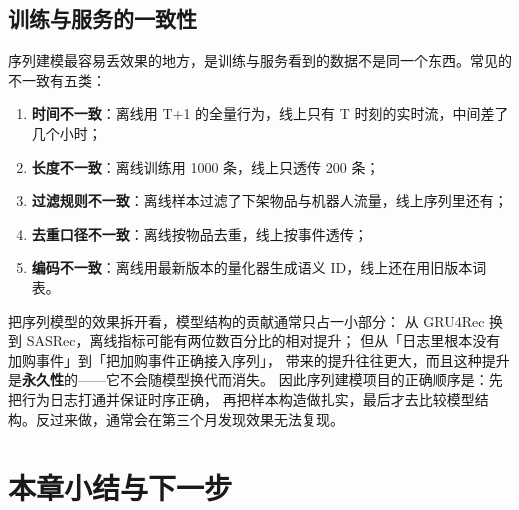 \subsection{训练与服务的一致性}

序列建模最容易丢效果的地方，是训练与服务看到的数据不是同一个东西。常见的不一致有五类：

\begin{enumerate}
  \item \textbf{时间不一致}：离线用 T+1 的全量行为，线上只有 T 时刻的实时流，中间差了几个小时；
  \item \textbf{长度不一致}：离线训练用 1000 条，线上只透传 200 条；
  \item \textbf{过滤规则不一致}：离线样本过滤了下架物品与机器人流量，线上序列里还有；
  \item \textbf{去重口径不一致}：离线按物品去重，线上按事件透传；
  \item \textbf{编码不一致}：离线用最新版本的量化器生成语义 ID，线上还在用旧版本词表。
\end{enumerate}

\begin{insight}[序列模型的收益八成来自数据管道]
把序列模型的效果拆开看，模型结构的贡献通常只占一小部分：
从 GRU4Rec 换到 SASRec，离线指标可能有两位数百分比的相对提升；
但从「日志里根本没有加购事件」到「把加购事件正确接入序列」，
带来的提升往往更大，而且这种提升是\textbf{永久性}的——它不会随模型换代而消失。
因此序列建模项目的正确顺序是：先把行为日志打通并保证时序正确，
再把样本构造做扎实，最后才去比较模型结构。反过来做，通常会在第三个月发现效果无法复现。
\end{insight}

\section{本章小结与下一步}

